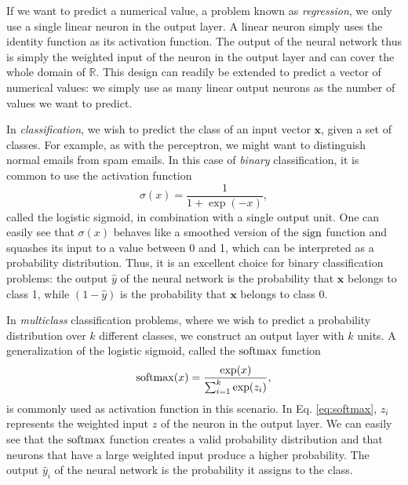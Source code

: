 If we want to predict a numerical value, a problem known as \emph{regression}, we only use a single linear neuron in the output layer. A linear neuron simply uses the identity function as its activation function. The output of the neural network thus is simply the weighted input of the neuron in the output layer and can cover the whole domain of $\mathbb{R}$. This design can readily be extended to predict a vector of numerical values: we simply use as many linear output neurons as the number of values we want to predict.

In \emph{classification}, we wish to predict the class of an input vector $\bm{x}$, given a set of classes. For example, as with the perceptron, we might want to distinguish normal emails from spam emails. In this case of \emph{binary} classification, it is common to use the activation function
\begin{equation}
\sigma(x) = \frac1{1+\exp(-x)},
\end{equation}
called the logistic sigmoid, in combination with a single output unit.
%		
One can easily see that $\sigma(x)$ behaves like a smoothed version of the $\operatorname{sign}$ function and squashes its input to a value between 0 and 1, which can be interpreted as a probability distribution. Thus, it is an excellent choice for binary classification problems: the output $\hat{y}$ of the neural network is the probability that $\bm{x}$ belongs to class 1, while $(1-\hat{y})$ is the probability that $\bm{x}$ belongs to class 0.

In \emph{multiclass} classification problems, where we wish to predict a probability distribution over $k$ different classes, we construct an output layer with $k$ units. A generalization of the logistic sigmoid, called the $\operatorname{softmax}$ function
\begin{equation}\label{eq:softmax}
\operatorname{softmax}(x) = \frac{\exp(x)}{\sum_{i=1}^{k}\exp(z_i)},
\end{equation}
is commonly used as activation function in this scenario. In Eq. \eqref{eq:softmax}, $z_i$ represents the weighted input $z$ of the  neuron in the output layer. We can easily see that the $\operatorname{softmax}$ function creates a valid probability distribution and that neurons that have a large weighted input produce a higher probability. The output $\hat{y}_i$ of the neural network is the probability it assigns to the  class.

